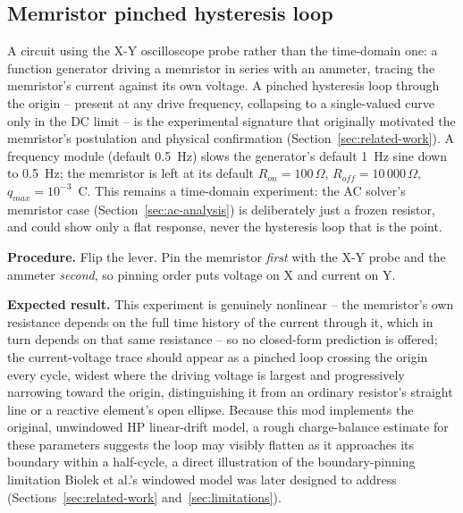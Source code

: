 \subsection{Memristor pinched hysteresis loop}
\label{sec:exp-memristor}

A circuit using the X-Y oscilloscope probe rather than the time-domain one: a function
generator driving a memristor in series with an ammeter, tracing the memristor's current
against its own voltage. A pinched hysteresis loop through the origin -- present at any drive
frequency, collapsing to a single-valued curve only in the DC limit -- is the experimental
signature that originally motivated the memristor's postulation and physical confirmation
(Section~\ref{sec:related-work}). A frequency module (default 0.5~Hz) slows the generator's
default 1~Hz sine down to 0.5~Hz; the memristor is left at its default $R_{on}=100\,\Omega$,
$R_{off}=10\,000\,\Omega$, $q_{max}=10^{-3}$~C. This remains a time-domain experiment: the AC
solver's memristor case (Section~\ref{sec:ac-analysis}) is deliberately just a frozen
resistor, and could show only a flat response, never the hysteresis loop that is the point.

\textbf{Procedure.} Flip the lever. Pin the memristor \emph{first} with the X-Y probe and the
ammeter \emph{second}, so pinning order puts voltage on X and current on Y.

\textbf{Expected result.} This experiment is genuinely nonlinear -- the memristor's own
resistance depends on the full time history of the current through it, which in turn depends
on that same resistance -- so no closed-form prediction is offered; the current-voltage trace
should appear as a pinched loop crossing the origin every cycle, widest where the driving
voltage is largest and progressively narrowing toward the origin, distinguishing it from an
ordinary resistor's straight line or a reactive element's open ellipse. Because this mod
implements the original, unwindowed HP linear-drift model, a rough charge-balance estimate
for these parameters suggests the loop may visibly flatten as it approaches its boundary
within a half-cycle, a direct illustration of the boundary-pinning limitation Biolek et al.'s
windowed model was later designed to address (Sections~\ref{sec:related-work}
and~\ref{sec:limitations}).
